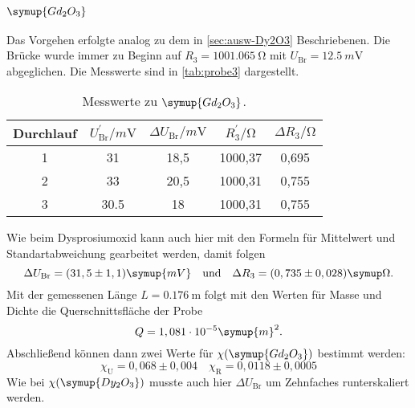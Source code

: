 \subsubsection{$\symup{Gd_2O_3}$}

Das Vorgehen erfolgte analog zu dem in \autoref{sec:ausw-Dy2O3} Beschriebenen. Die Brücke
wurde immer zu Beginn auf $R_3 = \SI{1001.065}{\ohm}$ mit $U_\text{Br} =
\SI{12.5}{m\volt}$ abgeglichen. Die Messwerte sind in \autoref{tab:probe3} dargestellt.

\begin{table}
  \centering
  \caption{Messwerte zu $\symup{Gd_2O_3}$.}
  \label{tab:probe3}
  \begin{tabular}{c c c c c}
  \toprule
  Durchlauf &
  $U_\text{Br}^\prime / \si{m\volt}$ &
  $\Delta U_\text{Br} / \si{m\volt}$ &
  $R_3^\prime / \si{\ohm} $ &
  $\Delta R_3 / \si{\ohm} $ \\
  \midrule
  1 & 31 & 18,5 & 1000,37 & 0,695 \\
  2 & 33 & 20,5 & 1000,31 & 0,755 \\
  3 & 30.5 & 18 & 1000,31 & 0,755 \\
  \bottomrule
  \end{tabular}
\end{table}
\noindent
Wie beim Dysprosiumoxid kann auch hier mit den Formeln für Mittelwert und
Standartabweichung gearbeitet werden, damit folgen 
\begin{equation}
	\Delta U_\text{Br} = (31,5 \pm 1,1) \symup{mV}
	\quad
	\text{und}
	\quad
	\Delta R_3 = (0,735 \pm 0,028) \symup\Omega.
\end{equation}
Mit der gemessenen Länge $L = \SI{0.176}{\meter}$ folgt mit den Werten für Masse und Dichte
die Querschnittsfläche der Probe
\begin{equation}
	Q = 1,081 \cdot 10^{-5} \symup{m}^2.
\end{equation}
Abschließend können dann zwei Werte für $\chi(\symup{Gd_2O_3})$ bestimmt werden:
\begin{equation}
	\chi_\text{U} = 0,068 \pm 0,004
	\quad
	\chi_\text{R} = 0,0118 \pm 0,0005
\end{equation}
Wie bei $\chi(\symup{Dy_2O_3})$ musste auch hier $\Delta U_\text{Br}$ um Zehnfaches
runterskaliert werden.

